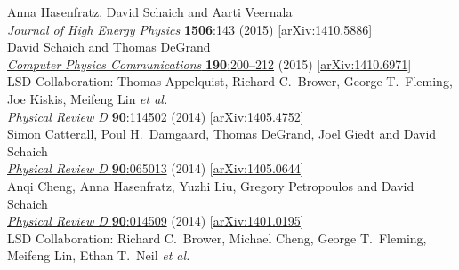 \begin{spacelist}
\begin{revnumerate}
      Anna Hasenfratz, David Schaich and Aarti Veernala \\
      \href{http://dx.doi.org/10.1007/JHEP06(2015)143}{\textit{Journal of High Energy Physics} \textbf{1506}:143} (2015) [\href{http://arxiv.org/abs/1410.5886}{arXiv:1410.5886}]
    \pagebreakitem
       \\
      David Schaich and Thomas DeGrand \\
      \href{http://dx.doi.org/10.1016/j.cpc.2014.12.025}{\textit{Computer Physics Communications} \textbf{190}:200--212} (2015) [\href{http://arxiv.org/abs/1410.6971}{arXiv:1410.6971}]
    \pagebreakitem
       \\
      LSD Collaboration: Thomas Appelquist, Richard C.~Brower, George T.~Fleming, Joe Kiskis, Meifeng Lin \textit{et al.} \\ %
      \href{http://dx.doi.org/10.1103/PhysRevD.90.114502}{\textit{Physical Review D} \textbf{90}:114502} (2014) [\href{http://arxiv.org/abs/1405.4752}{arXiv:1405.4752}]
    \pagebreakitem
       \\
      Simon Catterall, Poul H.~Damgaard, Thomas DeGrand, Joel Giedt and David Schaich \\
      \href{http://dx.doi.org/10.1103/PhysRevD.90.065013}{\textit{Physical Review D} \textbf{90}:065013} (2014) [\href{http://arxiv.org/abs/1405.0644}{arXiv:1405.0644}]
    \pagebreakitem
       \\
      Anqi Cheng, Anna Hasenfratz, Yuzhi Liu, Gregory Petropoulos and David Schaich \\
      \href{http://dx.doi.org/10.1103/PhysRevD.90.014509}{\textit{Physical Review D} \textbf{90}:014509} (2014) [\href{http://arxiv.org/abs/1401.0195}{arXiv:1401.0195}]
    \pagebreakitem
       \\
      LSD Collaboration: Richard C.~Brower, Michael Cheng, George T.~Fleming, Meifeng Lin, Ethan T.~Neil \textit{et al.} \\ %

\end{revnumerate}
\end{spacelist}
